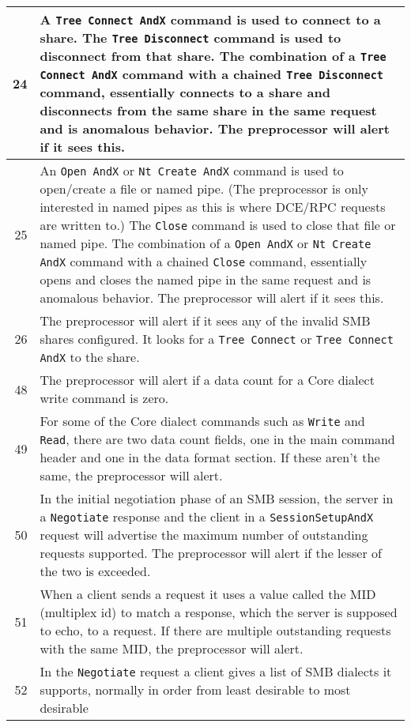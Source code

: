 \documentclass[english]{report}
\begin{document}
\begin{itemize}
\begin{longtable}{|r|p{13.5cm}|}
\hline
 24 & A \texttt{Tree Connect AndX} command is used to connect to a share. The
      \texttt{Tree Disconnect} command is used to disconnect from that share.
      The combination of a \texttt{Tree Connect AndX} command with a chained
      \texttt{Tree Disconnect} command, essentially connects to a share and
      disconnects from the same share in the same request and is anomalous
      behavior. The preprocessor will alert if it sees this.\\
\hline
 25 & An \texttt{Open AndX} or \texttt{Nt Create AndX} command is used to
      open/create a file or named pipe. (The preprocessor is only interested in
      named pipes as this is where DCE/RPC requests are written to.) The
      \texttt{Close} command is used to close that file or named pipe. The
      combination of a \texttt{Open AndX} or \texttt{Nt Create AndX} command
      with a chained \texttt{Close} command, essentially opens and closes the
      named pipe in the same request and is anomalous behavior.  The
      preprocessor will alert if it sees this.\\
\hline
 26 & The preprocessor will alert if it sees any of the invalid SMB shares
      configured. It looks for a \texttt{Tree Connect} or
      \texttt{Tree Connect AndX} to the share.\\
\hline
 48 & The preprocessor will alert if a data count for a Core dialect write
      command is zero.\\
\hline
 49 & For some of the Core dialect commands such as \texttt{Write} and
      \texttt{Read}, there are two data count fields, one in the main command
      header and one in the data format section.  If these aren't the same, the
      preprocessor will alert.\\
\hline
 50 & In the initial negotiation phase of an SMB session, the server in a
      \texttt{Negotiate} response and the client in a \texttt{SessionSetupAndX}
      request will advertise the maximum number of outstanding requests
      supported.  The preprocessor will alert if the lesser of the two is
      exceeded.\\
\hline
 51 & When a client sends a request it uses a value called the MID (multiplex
      id) to match a response, which the server is supposed to echo, to a
      request.  If there are multiple outstanding requests with the same
      MID, the preprocessor will alert.\\
\hline
 52 & In the \texttt{Negotiate} request a client gives a list of SMB dialects it
      supports, normally in order from least desirable to most desirable

\end{longtable}
\end{itemize}
\end{document}
